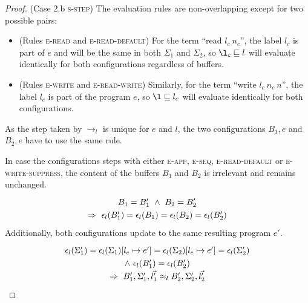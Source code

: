 \documentclass[10pt,preprint]{sigplanconf}
\newcommand{\arrayStretch}{1.28}
\begin{document}
\begin{proof}
(Case 2.b \textsc{s-step}) The evaluation rules are non-overlapping except for two possible pairs:
  \begin{itemize}
\item (Rules \textsc{e-read} and \textsc{e-read-default}) For the term ``read $l_c~n_c$'', the label $l_c$ is part of $e$ and will be the same in both $\Sigma_1$ and $\Sigma_2$, so $\l_c \sqsubseteq l$ will evaluate identically for both configurations regardless of buffers.
\item (Rules \textsc{e-write} and \textsc{e-read-write}) Similarly, for the term ``write $l_c~n_c~n$'', the label $l_c$ is part of the program $e$, so $\l \sqsubseteq l_c$ will evaluate identically for both configurations.
  \end{itemize}

  As the step taken by $\rightarrow_l$ is unique for $e$ and $l$, the two configurations $B_1,e$ and $B_2,e$ have to use the same rule.

  In case the configurations steps with either \textsc{e-app}, \textsc{e-seq}, \textsc{e-read-default} or \textsc{e-write-suppress}, the content of the buffers $B_1$ and $B_2$ is irrelevant and remains unchanged.
\[\arraycolsep=1.6pt\def\arraystretch{\arrayStretch}
\begin{array}{c}
  B_1 = B'_1 ~\wedge~ B_2 = B'_2 \\
  \Rightarrow~\epsilon_l(B'_1) = \epsilon_l(B_1) = \epsilon_l(B_2) = \epsilon_l(B'_2)
\end{array} \]
  Additionally, both configurations update to the same resulting program $e'$.
\[\arraycolsep=1.6pt\def\arraystretch{\arrayStretch}
\begin{array}{c}
  \epsilon_l(\Sigma'_1) = \epsilon_l(\Sigma_1)[l_e \mapsto e'] = \epsilon_l(\Sigma_2)[l_e \mapsto e'] = \epsilon_l(\Sigma'_2) \\
  \wedge~\epsilon_l(B'_1) = \epsilon_l(B'_2) \\
  \Rightarrow~B'_1,\Sigma'_1, \vec{l'_1} \approx_l B'_2,\Sigma'_2, \vec{l'_2} \\
\end{array} \]


\end{proof}
\end{document}
